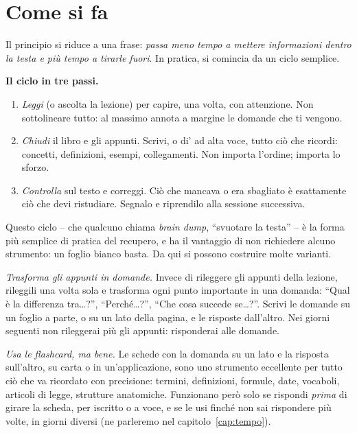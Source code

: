 \section{Come si fa}

Il principio si riduce a una frase: \emph{passa meno tempo a mettere
informazioni dentro la testa e più tempo a tirarle fuori}. In pratica,
si comincia da un ciclo semplice.

\begin{inpratica}
\textbf{Il ciclo in tre passi.}
\begin{enumerate}
  \item \emph{Leggi} (o ascolta la lezione) per capire, una volta, con
        attenzione. Non sottolineare tutto: al massimo annota a margine
        le domande che ti vengono.
  \item \emph{Chiudi} il libro e gli appunti. Scrivi, o di' ad alta
        voce, tutto ciò che ricordi: concetti, definizioni, esempi,
        collegamenti. Non importa l'ordine; importa lo sforzo.
  \item \emph{Controlla} sul testo e correggi. Ciò che mancava o era
        sbagliato è esattamente ciò che devi ristudiare. Segnalo e
        riprendilo alla sessione successiva.
\end{enumerate}
\end{inpratica}

Questo ciclo -- che qualcuno chiama \emph{brain dump}, \enquote{svuotare
la testa} -- è la forma più semplice di pratica del recupero, e ha il
vantaggio di non richiedere alcuno strumento: un foglio bianco basta.
Da qui si possono costruire molte varianti.

\emph{Trasforma gli appunti in domande.} Invece di rileggere gli appunti
della lezione, rileggili una volta sola e trasforma ogni punto
importante in una domanda: \enquote{Qual è la differenza tra\dots?},
\enquote{Perché\dots?}, \enquote{Che cosa succede se\dots?}. Scrivi le
domande su un foglio a parte, o su un lato della pagina, e le risposte
dall'altro. Nei giorni seguenti non rileggerai più gli appunti: risponderai
alle domande.

\emph{Usa le flashcard, ma bene.} Le schede con la domanda su un lato e
la risposta sull'altro, su carta o in un'applicazione, sono uno
strumento eccellente per tutto ciò che va ricordato con precisione:
termini, definizioni, formule, date, vocaboli, articoli di legge,
strutture anatomiche. Funzionano però solo se rispondi \emph{prima} di
girare la scheda, per iscritto o a voce, e se le usi finché non sai
rispondere più volte, in giorni diversi (ne parleremo nel
capitolo~\ref{cap:tempo}).

